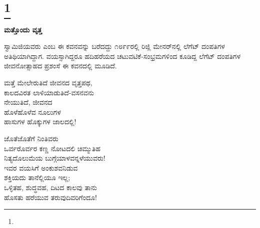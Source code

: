 \selecteng

\chapter[ONE MORE CIRCLE]{\protect\footnote{}}

\begin{myquote}
\end{myquote}

\begin{myquote}
\end{myquote}

\begin{myquote}
\end{myquote}

\selectkan

\begin{center}
\textbf{ಮತ್ತೊಂದು ವೃತ್ತ}
\end{center}

ಸ್ವಾಮಿಜಿಯವರು  ಎಂಬ ಈ ಕವನವನ್ನು ಬರೆದದ್ದು ೧೮೯೯ರಲ್ಲಿ ರಿಜ್ಲಿ ಮೇನರ್‌ನಲ್ಲಿ ಲೆಗೆಟ್ ದಂಪತಿಗಳ ಅತಿಥಿಯಾಗಿದ್ದಾಗ. ವಯಸ್ಸಾಗಿದ್ದರೂ ಹದಿಹರೆಯದ ಚಟುವಟಿಕೆ-ಸಂಭ್ರಮಗಳಿಂದ ಕೂಡಿದ್ದ ಲೆಗೆಟ್ ದಂಪತಿಗಳ ಜೀವನೋತ್ಸಾಹದ ಪ್ರಶಂಸೆ ಈ ಕವನದಲ್ಲಿ ಮೂಡಿದೆ.

\begin{myquote}
ಮತ್ತೆ ಮೇಲೇರುತಿದೆ ಜೀವನದ ವೃತ್ತಪಥ,\\ಕಾಲದವಿರತ ಲಾಳಿಯಾಡುತಿದೆ-ವಸನವನು\\ನೇಯುತಿದೆ, ಜೀವನದ\\ಹೊಳೆಹೊಳೆವ ನೂಲುಗಳ\\ಹಾಸುಗಳ ಹೊಕ್ಕುಗಳ ಜಾಲದಲ್ಲಿ!
\end{myquote}

\begin{myquote}
ಜೊತೆಜೊತೆಗೆ ನಿಂತಿವರು\\ಒರ್ವರೊರ್ವರ ಕಣ್ಣ ನೋಟದಲಿ ಚಿಮ್ಮುತಿಹ\\ನಿತ್ಯದೊಲುಮೆಯ ಬುಗ್ಗೆಯಾಳವನ್ನಳೆಯುವರು!\\ಇವರ ವಯಸಿಗೆ ಅಂಕುಶವನಿಡುವ\\ಶಕ್ತಿಯದು ತಾನೆಲ್ಲಿಯೂ ಇಲ್ಲ;\\ಒಳ್ಳಿತಹ, ಶುದ್ಧವಹ, ದಿಟದ ಕಾಲವು ತಾನು\\ಹೊಸತು ಹರೆಯುವ ತರುವುದಿವರಿಗೆಂದೂ!
\end{myquote}

